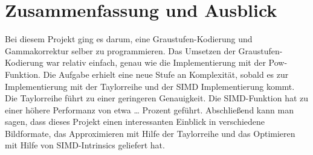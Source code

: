 \documentclass[course=erap]{aspdoc}
\begin{document}
\section{Zusammenfassung und Ausblick}
\par
Bei\cite{vmintromiami} diesem Projekt ging es darum, eine Graustufen-Kodierung und Gammakorrektur selber zu programmieren. Das Umsetzen der Graustufen-Kodierung war relativ einfach, genau wie die Implementierung mit der Pow-Funktion. Die Aufgabe erhielt eine neue Stufe an Komplexität, sobald es zur Implementierung mit der Taylorreihe und der SIMD Implementierung kommt. Die Taylorreihe führt zu einer geringeren Genauigkeit. Die SIMD-Funktion hat zu einer höhere Performanz von etwa … Prozent geführt. Abschließend kann man sagen, dass dieses Projekt einen interessanten Einblick in verschiedene Bildformate, das Approximieren mit Hilfe der Taylorreihe und das Optimieren mit Hilfe von SIMD-Intrinsics geliefert hat.



\end{document}
